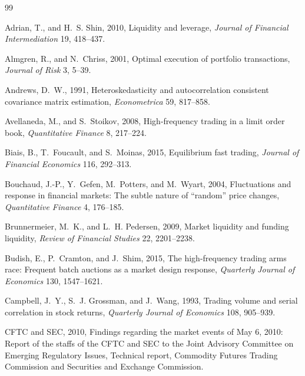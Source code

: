 \documentclass[12pt]{article}
\theoremstyle{definition}
\theoremstyle{remark}
\begin{document}
\newpage
\begin{thebibliography}{99}
\small
\setlength{\itemsep}{0.0pt plus 0.3pt}
\setlength{\parsep}{0.0pt}

Adrian, T., and H.~S. Shin, 2010, Liquidity and leverage, \emph{Journal of Financial Intermediation} 19, 418--437.

Almgren, R., and N.~Chriss, 2001, Optimal execution of portfolio transactions, \emph{Journal of Risk} 3, 5--39.

Andrews, D.~W., 1991, Heteroskedasticity and autocorrelation consistent covariance matrix estimation, \emph{Econometrica} 59, 817--858.

Avellaneda, M., and S.~Stoikov, 2008, High-frequency trading in a limit order book, \emph{Quantitative Finance} 8, 217--224.

Biais, B., T.~Foucault, and S.~Moinas, 2015, Equilibrium fast trading, \emph{Journal of Financial Economics} 116, 292--313.

Bouchaud, J.-P., Y.~Gefen, M.~Potters, and M.~Wyart, 2004, Fluctuations and response in financial markets: The subtle nature of ``random'' price changes, \emph{Quantitative Finance} 4, 176--185.

Brunnermeier, M.~K., and L.~H. Pedersen, 2009, Market liquidity and funding liquidity, \emph{Review of Financial Studies} 22, 2201--2238.

Budish, E., P.~Cramton, and J.~Shim, 2015, The high-frequency trading arms race: Frequent batch auctions as a market design response, \emph{Quarterly Journal of Economics} 130, 1547--1621.

Campbell, J.~Y., S.~J. Grossman, and J.~Wang, 1993, Trading volume and serial correlation in stock returns, \emph{Quarterly Journal of Economics} 108, 905--939.

CFTC and SEC, 2010, Findings regarding the market events of May 6, 2010: Report of the staffs of the CFTC and SEC to the Joint Advisory Committee on Emerging Regulatory Issues, Technical report, Commodity Futures Trading Commission and Securities and Exchange Commission.


\end{thebibliography}
\end{document}
